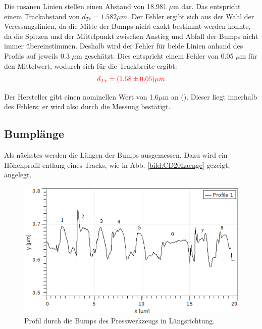 Die rosanen Linien stellen einen Abstand von 18.981 $\mu$m dar. Das entspricht einem Trackabstand von $d_{Tr} = 1.582 \mu m$.
Der Fehler ergibt sich aus der Wahl der Veressungslinien, da die Mitte der Bumps nicht exakt bestimmt werden konnte, da die Spitzen und 
der Mittelpunkt zwischen Anstieg und Abfall der Bumps nicht immer übereinstimmen. Deshalb wird der Fehler für beide Linien anhand des 
Profils auf jeweils 0.3 $\mu$m geschätzt. Dies entspricht einem Fehler von 0.05 $\mu$m für den Mittelwert, wodurch sich für die Trackbreite 
ergibt: 
\begin{equation*}
    \textcolor{red}{d_{Tr} = (1.58 \pm 0.05) \mu m}
\end{equation*}

Der Hersteller gibt einen nominellen Wert von 1.6$\mu$m an (\cite{SampleKit2007}). 
Dieser liegt innerhalb des Fehlers; er wird also durch die Messung bestätigt.

\subsection{Bumplänge}

Als nächstes werden die Längen der Bumps ausgemessen. Dazu wird ein Höhenprofil entlang eines Tracks, wie in Abb. \ref{bild:CD20Laenge} 
gezeigt, angelegt.  

\begin{figure}[h]
    \centering
    \includegraphics[scale = 0.8]{Bilder/CD20LaengeProfil.png}
    \caption{Profil durch die Bumps des Presswerkzeugs in Längsrichtung.}
    \label{bild:CD20LaengeProfil}
\end{figure}


